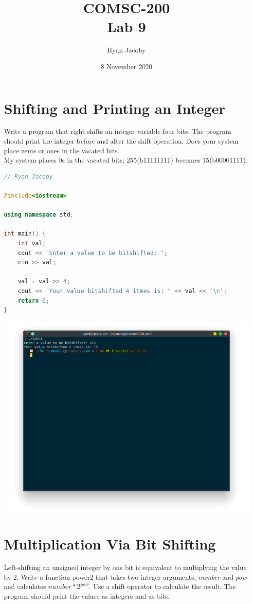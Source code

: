 \documentclass[letterpaper, 11pt]{article}
\title{COMSC-200 \\ Lab 9}
\author{Ryan Jacoby}
\date{8 November 2020}
\begin{document}
\maketitle

\section{Shifting and Printing an Integer}
Write a program that right-shifts an integer variable four bits.  The program should print the integer before and after the shift operation.  Does your system place zeros or ones in the vacated bits. \\

My system places 0s in the vacated bits; 255(b11111111) becomes 15(b00001111).

\begin{lstlisting}[language=c++, caption=main.cpp]
// Ryan Jacoby

#include<iostream>

using namespace std;

int main() {
    int val;
    cout << "Enter a value to be bitshifted: ";
    cin >> val;
    
    val = val >> 4;
    cout << "Your value bitshifted 4 itmes is: " << val << '\n';
    return 0;
}
\end{lstlisting}

\includegraphics[scale=0.5]{right_shift.png}

\section{Multiplication Via Bit Shifting}
Left-shifting an unsigned integer by one bit is equivalent to multiplying the value by 2.  Write a function power2 that takes two integer arguments, \textit{number} and \textit{pow} and calculates $number * 2^{pow}$.  Use a shift operator to calculate the result.  The program should print the values as integers and as bits.
\end{document}
